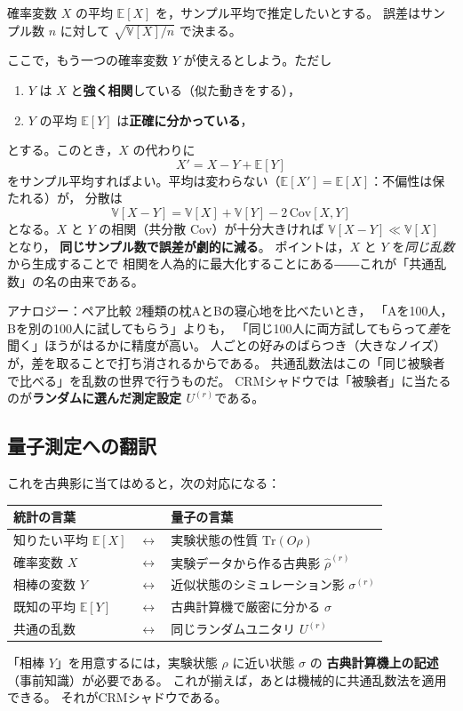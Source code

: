 \documentclass[11pt]{ltjsarticle}
\newcommand{\Tr}{\mathrm{Tr}}
\newcommand{\E}{\mathbb{E}}
\newcommand{\Var}{\mathbb{V}}
\newcommand{\Cov}{\mathrm{Cov}}
\begin{document}
確率変数 $X$ の平均 $\E[X]$ を，サンプル平均で推定したいとする。
誤差はサンプル数 $n$ に対して $\sqrt{\Var[X]/n}$ で決まる。

ここで，もう一つの確率変数 $Y$ が使えるとしよう。ただし
\begin{enumerate}
  \item $Y$ は $X$ と\textbf{強く相関}している（似た動きをする），
  \item $Y$ の平均 $\E[Y]$ は\textbf{正確に分かっている}，
\end{enumerate}
とする。このとき，$X$ の代わりに
\begin{equation}
  X' = X - Y + \E[Y]
\end{equation}
をサンプル平均すればよい。平均は変わらない（$\E[X']=\E[X]$：不偏性は保たれる）が，
分散は
\begin{equation}
  \Var[X - Y] = \Var[X] + \Var[Y] - 2\,\Cov[X,Y]
\end{equation}
となる。$X$ と $Y$ の相関（共分散 $\Cov$）が十分大きければ
$\Var[X-Y] \ll \Var[X]$ となり，
\textbf{同じサンプル数で誤差が劇的に減る}。
ポイントは，$X$ と $Y$ を\emph{同じ乱数}から生成することで
相関を人為的に最大化することにある――これが「共通乱数」の名の由来である。

\begin{analogybox}{アナロジー：ペア比較}
2種類の枕AとBの寝心地を比べたいとき，
「Aを100人，Bを別の100人に試してもらう」よりも，
「同じ100人に両方試してもらって\emph{差}を聞く」ほうがはるかに精度が高い。
人ごとの好みのばらつき（大きなノイズ）が，差を取ることで打ち消されるからである。
共通乱数法はこの「同じ被験者で比べる」を乱数の世界で行うものだ。
CRMシャドウでは「被験者」に当たるのが\textbf{ランダムに選んだ測定設定 $U^{(r)}$}である。
\end{analogybox}

\subsection{量子測定への翻訳}

これを古典影に当てはめると，次の対応になる：
\begin{center}
\begin{tabular}{lll}
\hline
統計の言葉 & & 量子の言葉 \\
\hline
知りたい平均 $\E[X]$ & $\longleftrightarrow$ & 実験状態の性質 $\Tr(O\rho)$ \\
確率変数 $X$ & $\longleftrightarrow$ & 実験データから作る古典影 $\hat\rho^{(r)}$ \\
相棒の変数 $Y$ & $\longleftrightarrow$ & 近似状態のシミュレーション影 $\sigma^{(r)}$ \\
既知の平均 $\E[Y]$ & $\longleftrightarrow$ & 古典計算機で厳密に分かる $\sigma$ \\
共通の乱数 & $\longleftrightarrow$ & 同じランダムユニタリ $U^{(r)}$ \\
\hline
\end{tabular}
\end{center}
「相棒 $Y$」を用意するには，実験状態 $\rho$ に近い状態 $\sigma$ の
\textbf{古典計算機上の記述}（事前知識）が必要である。
これが揃えば，あとは機械的に共通乱数法を適用できる。
それがCRMシャドウである。
\end{document}
